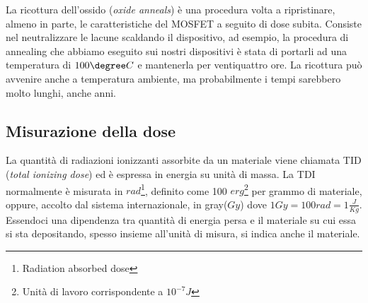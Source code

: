 La ricottura dell'ossido (\textit{oxide anneals}) è una procedura volta a ripristinare, almeno in parte, le caratteristiche del MOSFET a seguito di dose subita.
Consiste nel neutralizzare le lacune scaldando il dispositivo, ad esempio, la procedura di annealing che abbiamo eseguito sui nostri dispositivi è stata di portarli ad una temperatura di $100\degree C$ e mantenerla per ventiquattro ore. La ricottura può avvenire anche a temperatura ambiente, ma probabilmente i tempi sarebbero molto lunghi, anche anni\cite{bib:Effetti_Radiazioni_NASA}. 


\subsection{Misurazione della dose}
La quantità di radiazioni ionizzanti assorbite da un materiale viene chiamata TID (\textit{total ionizing dose}) ed è espressa in energia su unità di massa.
La TDI normalmente è misurata in $rad$\footnote{Radiation absorbed dose}, definito come 100 $erg$\footnote{Unità di lavoro corrispondente a $10^{-7} J$} per grammo di materiale, oppure, accolto dal sistema internazionale, in gray($Gy$) dove $1 Gy = 100rad = 1\frac{J}{Kg}$.
Essendoci una dipendenza tra quantità di energia persa e il materiale su cui essa si sta depositando, spesso insieme all'unità di misura, si indica anche il materiale. 





